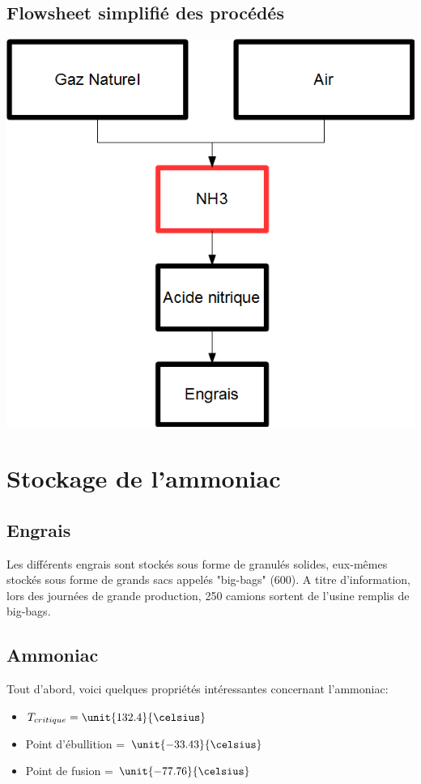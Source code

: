 \subsection*{Flowsheet simplifié des procédés}
\begin{center}
\includegraphics[scale=0.6]{FlYara.png}
\end{center}

\newpage
\section*{Stockage de l'ammoniac}
\subsection*{Engrais}
Les différents engrais sont stockés sous forme de granulés solides, eux-mêmes stockés sous forme de grands sacs appelés "big-bags" (\unit{600}{\kilogram}). A titre d'information, lors des journées de grande production, 250 camions sortent de l'usine remplis de big-bags. 
\subsection*{Ammoniac}
Tout d'abord, voici quelques propriétés intéressantes concernant l'ammoniac:

\begin{itemize}
\item{$T_{critique} = \unit{132.4}{\celsius}$}

\item{Point d'ébullition = $\unit{-33.43}{\celsius}$}

\item{Point de fusion = $\unit{-77.76}{\celsius}$}
\end{itemize}

